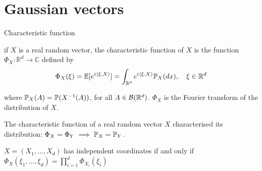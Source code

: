 \documentclass[handout, 10pt]{beamer} %
\begin{document}


 


  \section{Gaussian vectors}

  \begin{frame}{Characteristic function}

    \begin{definition}
      if $X$ is a real random vector, the characteristic function of $X$ is the function
      $\Phi_{X}: \mathbb{R}^{d} \longrightarrow \mathbb{C}$ defined by
      $$
      \Phi_{X}(\xi)=\E[e^{i\langle \xi,X \rangle}] = \int_{\Rd} e^{i\langle \xi,X \rangle} \P_{X}(d x), \quad \xi \in \mathbb{R}^{d}
      $$

    where $\P_X(A) = \P(X^{-1}(A))$, for all $A \in \cB(\Rd)$. $\Phi_{X}$ is the Fourier transform of the distribution of $X$.
    \end{definition}

    \pause

    \begin{theorem}
      The characteristic function of a real random vector $X$ characterised its
      distribution: $\Phi_X = \Phi_Y \implies \P_X = \P_Y$.
    \end{theorem}

    \pause

    
    \begin{corollary}
      $X=(X_1,\ldots,X_d)$ has independent coordinates if and only if \\
      $\Phi_{X}\left(\xi_{1}, \ldots, \xi_{d}\right)=\prod_{i=1}^{d}
      \Phi_{X_{i}}\left(\xi_{i}\right)$
    \end{corollary}
  \end{frame}
\end{document}
